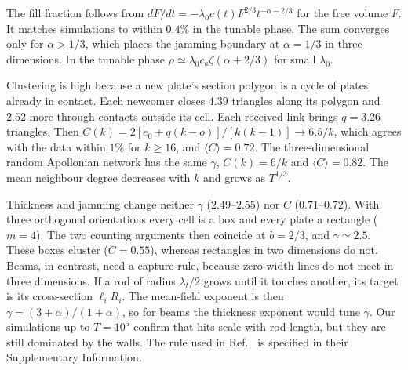The fill fraction follows from $dF/dt=-\lambda_0c(t)F^{2/3}t^{-\alpha-2/3}$ for the free
volume $F$. It matches simulations to within $0.4\%$ in the tunable phase. The sum
converges only for $\alpha>1/3$, which places the jamming boundary at $\alpha=1/3$ in three
dimensions. In the tunable phase $\rho\simeq\lambda_0c_a\zeta(\alpha+2/3)$ for small
$\lambda_0$.

Clustering is high because a new plate's section polygon is a cycle of plates already in
contact. Each newcomer closes $4.39$ triangles along its polygon and $2.52$ more through
contacts outside its cell. Each received link brings $q=3.26$ triangles. Then
$C(k)=2[e_0+q(k-o)]/[k(k-1)]\to6.5/k$, which agrees with the data within $1\%$ for $k\ge16$,
and $\langle C\rangle=0.72$. The three-dimensional random Apollonian network has the same
$\gamma$, $C(k)=6/k$ and $\langle C\rangle=0.82$. The mean neighbour degree decreases with
$k$ and grows as $T^{1/3}$.

Thickness and jamming change neither $\gamma$ ($2.49$--$2.55$) nor $C$ ($0.71$--$0.72$).
With three orthogonal orientations every cell is a box and every plate a rectangle
($m=4$). The two counting arguments then coincide at $b=2/3$, and $\gamma\simeq2.5$. These
boxes cluster ($C=0.55$), whereas rectangles in two dimensions do not. Beams, in contrast,
need a capture rule, because zero-width lines do not meet in three dimensions. If a rod of
radius $\lambda_t/2$ grows until it touches another, its target is its cross-section
$\ell_iR_i$. The mean-field exponent is then $\gamma=(3+\alpha)/(1+\alpha)$, so for beams
the thickness exponent would tune $\gamma$. Our simulations up to $T=10^5$ confirm that
hits scale with rod length, but they are still dominated by the walls. The rule used in
Ref.~\cite{both2026} is specified in their Supplementary Information.
